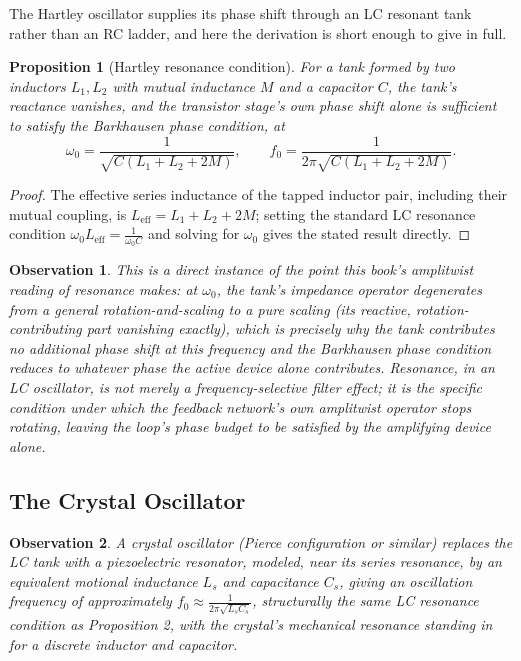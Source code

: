 \documentclass[12pt]{article}
\newtheorem{proposition}{Proposition}
\newtheorem{observation}{Observation}
\begin{document}
The Hartley oscillator supplies its phase shift through an LC resonant tank rather than an RC ladder, and here the derivation is short enough to give in full.

\begin{proposition}[Hartley resonance condition]
For a tank formed by two inductors $L_1, L_2$ with mutual inductance $M$ and a capacitor $C$, the tank's reactance vanishes, and the transistor stage's own phase shift alone is sufficient to satisfy the Barkhausen phase condition, at
\[
\omega_0 = \frac{1}{\sqrt{C(L_1 + L_2 + 2M)}}, \qquad f_0 = \frac{1}{2\pi\sqrt{C(L_1+L_2+2M)}}.
\]
\end{proposition}

\begin{proof}
The effective series inductance of the tapped inductor pair, including their mutual coupling, is $L_{\text{eff}} = L_1 + L_2 + 2M$; setting the standard LC resonance condition $\omega_0 L_{\text{eff}} = \frac{1}{\omega_0 C}$ and solving for $\omega_0$ gives the stated result directly.
\end{proof}

\begin{observation}
This is a direct instance of the point this book's amplitwist reading of resonance makes: at $\omega_0$, the tank's impedance operator degenerates from a general rotation-and-scaling to a pure scaling (its reactive, rotation-contributing part vanishing exactly), which is precisely why the tank contributes no additional phase shift at this frequency and the Barkhausen phase condition reduces to whatever phase the active device alone contributes. Resonance, in an LC oscillator, is not merely a frequency-selective filter effect; it is the specific condition under which the feedback network's own amplitwist operator stops rotating, leaving the loop's phase budget to be satisfied by the amplifying device alone.
\end{observation}

\subsection{The Crystal Oscillator}

\begin{observation}
A crystal oscillator (Pierce configuration or similar) replaces the LC tank with a piezoelectric resonator, modeled, near its series resonance, by an equivalent motional inductance $L_s$ and capacitance $C_s$, giving an oscillation frequency of approximately $f_0 \approx \frac{1}{2\pi\sqrt{L_sC_s}}$, structurally the same LC resonance condition as Proposition 2, with the crystal's mechanical resonance standing in for a discrete inductor and capacitor.
\end{observation}
\end{document}

